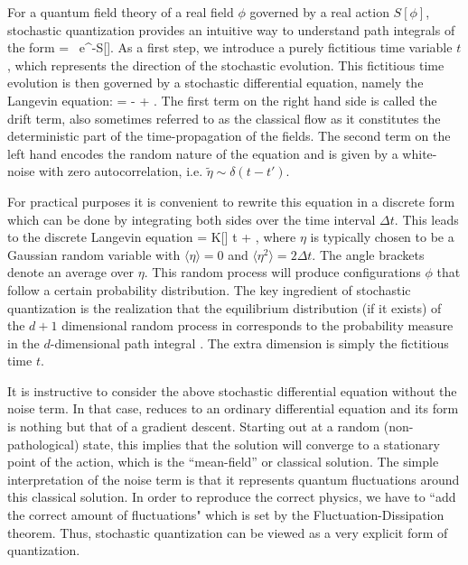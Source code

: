 \documentclass[../main.tex]{subfiles}
\begin{document}
For a quantum field theory of a real field $\phi$ governed by a real action $S[\phi]$, stochastic quantization provides an intuitive way to understand path integrals of the form
\beq
  \label{Eq:PathIntegralSQ}
  \CZ = \int\CD\phi\ {\rm e}^{-S[\phi]}.
\eeq
 As a first step, we introduce a purely fictitious time variable $t$, which represents the direction of the stochastic evolution. This fictitious time evolution is then governed by a stochastic differential equation, namely the Langevin equation:
 \beq
   \label{Eq:Langevin_continuum}
    = - + \tilde{\eta}.
 \eeq
The first term on the right hand side is called the drift term, also sometimes referred to as the classical flow as it constitutes the deterministic part of the time-propagation of the fields. The second term on the left hand encodes the random nature of the equation and is given by a white-noise with zero autocorrelation, i.e. $\tilde\eta \sim \delta(t-t')$.

For practical purposes it is convenient to rewrite this equation in a discrete form which can be done by integrating both sides over the time interval $\Delta t$. This leads to the discrete Langevin equation
%
\beq
  \label{Eq:Langevin}
  \Delta \phi = K[\phi] \Delta t + \eta,
\eeq
%
where $\eta$ is typically chosen to be a Gaussian random variable with $\langle \eta \rangle = 0$ and $\langle \eta^2 \rangle = 2\Delta t$. The angle brackets denote an
average over $\eta$. This random process will produce configurations $\phi$ that follow a certain probability distribution. The key ingredient of stochastic quantization
is the realization that the equilibrium distribution (if it exists) of the $d+1$ dimensional random process in  corresponds to the probability measure in the $d$-dimensional path integral . The extra dimension is simply the fictitious time $t$.

It is instructive to consider the above stochastic differential equation without the noise term. In that case,  reduces to an ordinary differential equation and its form is nothing but that of a gradient descent. Starting out at a random (non-pathological) state, this implies that the solution will converge to a stationary point of the action, which is the ``mean-field'' or classical solution. The simple interpretation of the noise term is that it represents quantum fluctuations around this classical solution. In order to reproduce the correct physics, we have to ``add the correct amount of fluctuations" which is set by the Fluctuation-Dissipation theorem. Thus, stochastic quantization can be viewed as a very explicit form of quantization.
\end{document}

